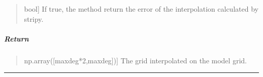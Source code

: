 \documentclass[letterpaper,10pt,english]{sphinxmanual}
\begin{document}
\begin{fulllineitems}
\begin{quote}
\begin{description}
\sphinxlineitem{error}{[}bool{]}
\sphinxAtStartPar
If true, the method return the error of the interpolation calculated by stripy.

\end{description}
\end{quote}


\subparagraph{Return}
\label{\detokenize{GRID_doc/GRID_class_doc:return}}\begin{quote}
\begin{description}
\sphinxlineitem{grd}{[}np.array({[}maxdeg*2,maxdeg{]}){]}
\sphinxAtStartPar
The grid interpolated on the model grid.

\end{description}
\end{quote}

\end{fulllineitems}



\bigskip\hrule\bigskip

\end{document}
